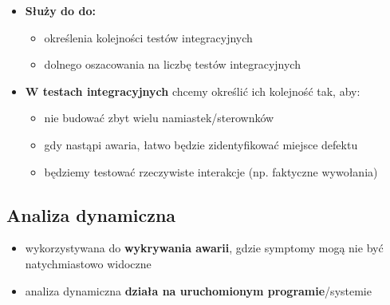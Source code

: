 \documentclass[../main.tex]{subfiles}
\begin{document}
\begin{itemize}
\begin{itemize}
            \item \textbf{Służy do do:}
            \begin{itemize}
                \item określenia kolejności testów integracyjnych
                \item dolnego oszacowania na liczbę testów integracyjnych
            \end{itemize}

            \item \textbf{W testach integracyjnych} chcemy określić ich kolejność tak, aby:
            \begin{itemize}
                \item nie budować zbyt wielu namiastek/sterownków
                \item gdy nastąpi awaria, łatwo będzie zidentyfikować miejsce defektu
                \item będziemy testować rzeczywiste interakcje (np. faktyczne wywołania)
            \end{itemize}
        \end{itemize}
    \end{itemize}

    \subsection{Analiza dynamiczna}
    \begin{itemize}
        \item wykorzystywana do \textbf{wykrywania awarii}, gdzie symptomy mogą nie być natychmiastowo widoczne
        \item analiza dynamiczna \textbf{działa na uruchomionym programie}/systemie
    \end{itemize}
\end{document}
